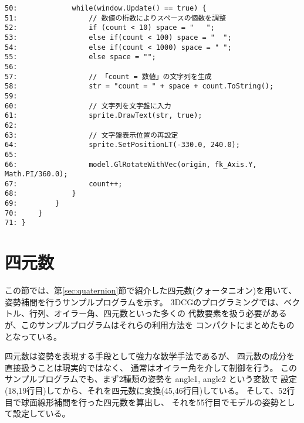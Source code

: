 \begin{breakbox}
\begin{small}
\begin{verbatim}
50:             while(window.Update() == true) {
51:                 // 数値の桁数によりスペースの個数を調整
52:                 if (count < 10) space = "   ";
53:                 else if(count < 100) space = "  ";
54:                 else if(count < 1000) space = " ";
55:                 else space = "";
56: 
57:                 // 「count = 数値」の文字列を生成
58:                 str = "count = " + space + count.ToString();
59: 
60:                 // 文字列を文字盤に入力
61:                 sprite.DrawText(str, true);
62: 
63:                 // 文字盤表示位置の再設定
64:                 sprite.SetPositionLT(-330.0, 240.0);
65: 
66:                 model.GlRotateWithVec(origin, fk_Axis.Y, Math.PI/360.0);
67:                 count++;
68:             }
69:         }
70:     }
71: }
\end{verbatim}
\end{small}
\end{breakbox}

\section{四元数}
この節では、第\ref{sec:quaternion}節で紹介した四元数(クォータニオン)を用いて、
姿勢補間を行うサンプルプログラムを示す。
3DCGのプログラミングでは、ベクトル、行列、オイラー角、四元数といった多くの
代数要素を扱う必要があるが、このサンプルプログラムはそれらの利用方法を
コンパクトにまとめたものとなっている。

四元数は姿勢を表現する手段として強力な数学手法であるが、
四元数の成分を直接扱うことは現実的ではなく、
通常はオイラー角を介して制御を行う。
このサンプルプログラムでも、まず2種類の姿勢を angle1, angle2 という変数で
設定(18,19行目)してから、それを四元数に変換(45,46行目)している。
そして、52行目で球面線形補間を行った四元数を算出し、
それを55行目でモデルの姿勢として設定している。\\ ~

